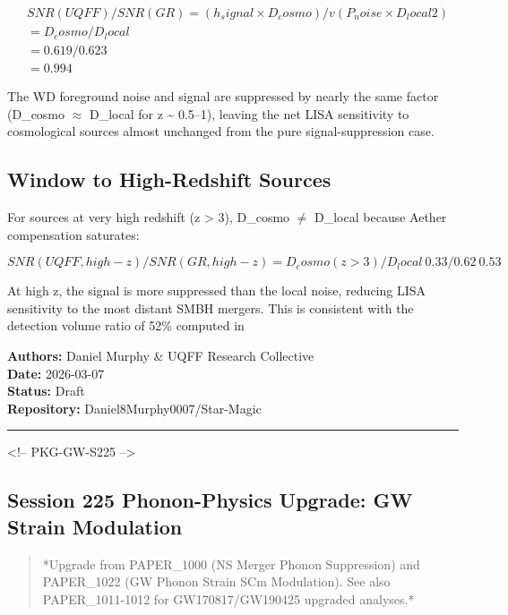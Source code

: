 \documentclass[12pt,a4paper]{article}
\begin{document}
\begin{equation}
\begin{aligned}
  & SNR(UQFF) / SNR(GR) = (h_signal \times D_cosmo) / v(P_noise \times D_local2) \\
  & = D_cosmo / D_local \\
  & = 0.619 / 0.623 \\
  & = 0.994
\end{aligned}
\end{equation}

The WD foreground noise and signal are suppressed by nearly the same factor (D\_cosmo $\approx$ D\_local for z \textasciitilde{} 0.5--1), leaving the net LISA sensitivity to cosmological sources almost unchanged from the pure signal-suppression case.

\subsection{Window to High-Redshift Sources}

For sources at very high redshift (z > 3), D\_cosmo $\neq$ D\_local because Aether compensation saturates:

\begin{equation}
SNR(UQFF, high-z) / SNR(GR, high-z) = D_cosmo(z>3) / D_local ~ 0.33/0.62 ~ 0.53
\end{equation}

At high z, the signal is more suppressed than the local noise, reducing LISA sensitivity to the most distant SMBH mergers. This is consistent with the detection volume ratio of 52\% computed in

\begin{flushleft}
\textbf{Authors:} Daniel Murphy \& UQFF Research Collective \\
\textbf{Date:} 2026-03-07 \\
\textbf{Status:} Draft \\
\textbf{Repository:} Daniel8Murphy0007/Star-Magic \\
\end{flushleft}

\medskip\hrule\medskip

<!-- PKG-GW-S225 -->

\subsection{Session 225 Phonon-Physics Upgrade: GW Strain Modulation}

\begin{quote}
*Upgrade from PAPER\_1000 (NS Merger Phonon Suppression) and PAPER\_1022
(GW Phonon Strain SCm Modulation). See also PAPER\_1011-1012 for
GW170817/GW190425 upgraded analyses.*
\end{quote}
\end{document}
